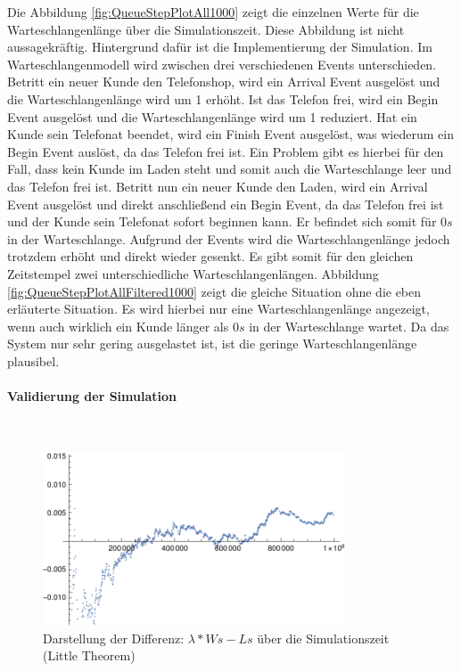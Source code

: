 Die Abbildung \ref{fig:QueueStepPlotAll1000} zeigt die einzelnen Werte für die Warteschlangenlänge über die Simulationszeit. Diese Abbildung ist nicht aussagekräftig. Hintergrund dafür ist die Implementierung der Simulation. Im Warteschlangenmodell wird zwischen drei verschiedenen Events unterschieden. Betritt ein neuer Kunde den Telefonshop, wird ein Arrival Event ausgelöst und die Warteschlangenlänge wird um 1 erhöht. Ist das Telefon frei, wird ein Begin Event ausgelöst und die Warteschlangenlänge wird um 1 reduziert. Hat ein Kunde sein Telefonat beendet, wird ein Finish Event ausgelöst, was wiederum ein Begin Event auslöst, da das Telefon frei ist. Ein Problem gibt es hierbei für den Fall, dass kein Kunde im Laden steht und somit auch die Warteschlange leer und das Telefon frei ist. Betritt nun ein neuer Kunde den Laden, wird ein Arrival Event ausgelöst und direkt anschließend ein Begin Event, da das Telefon frei ist und der Kunde sein Telefonat sofort beginnen kann. Er befindet sich somit für $0s$ in der Warteschlange. Aufgrund der Events wird die Warteschlangenlänge jedoch trotzdem erhöht und direkt wieder gesenkt. Es gibt somit für den gleichen Zeitstempel zwei unterschiedliche Warteschlangenlängen. Abbildung \ref{fig:QueueStepPlotAllFiltered1000} zeigt die gleiche Situation ohne die eben erläuterte Situation. Es wird hierbei nur eine Warteschlangenlänge angezeigt, wenn auch wirklich ein Kunde länger als $0s$ in der Warteschlange wartet. Da das System nur sehr gering ausgelastet ist, ist die geringe Warteschlangenlänge plausibel.\\

\paragraph{Validierung der Simulation}
\\
\begin{figure}[htpb]
	\centering
	\includegraphics[width=0.8\textwidth]{abbildungen/1_Phone/Arrival_1000_Serve_100_dur_1000000_Skip_0/LittleSystem.pdf}
	\caption{Darstellung der Differenz: $\lambda * Ws - Ls$ über die Simulationszeit (Little Theorem)}
	\label{fig:LittleSystem1000}
\end{figure} 

